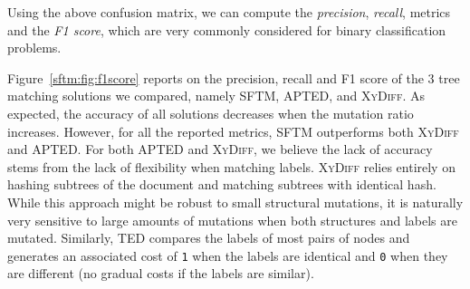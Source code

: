 Using the above confusion matrix, we can compute the \textit{precision}, \textit{recall}, metrics and the \textit{F1 score}, which are very commonly considered for binary classification problems.

Figure~\ref{sftm:fig:f1score} reports on the precision, recall and F1 score of the 3 tree matching solutions we compared, namely SFTM, APTED, and \textsc{XyDiff}.
As expected, the accuracy of all solutions decreases when the mutation ratio increases.
However, for all the reported metrics, SFTM outperforms both \textsc{XyDiff} and APTED.
For both APTED and \textsc{XyDiff}, we believe the lack of accuracy stems from the lack of flexibility when matching labels.
\textsc{XyDiff} relies entirely on hashing subtrees of the document and matching subtrees with identical hash.
While this approach might be robust to small structural mutations, it is naturally very sensitive to large amounts of mutations when both structures and labels are mutated.
Similarly, TED compares the labels of most pairs of nodes and generates an associated cost of \texttt{1} when the labels are identical and \texttt{0} when they are different (no gradual costs if the labels are similar).

